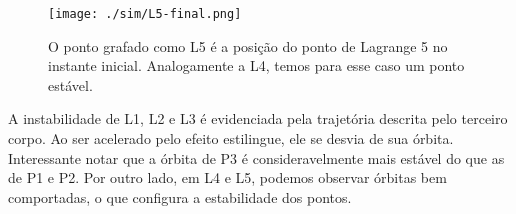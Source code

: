 \begin{figure}[!H]
\centering
\texttt{[image: ./sim/L5-final.png]}
\caption{O ponto grafado como L5 é a posição do ponto de Lagrange 5 no instante inicial. Analogamente a L4, temos para esse caso um ponto estável.}
\end{figure}

   A instabilidade de L1, L2 e L3 é evidenciada pela trajetória descrita pelo terceiro corpo. Ao ser acelerado pelo efeito estilingue, ele se desvia de sua órbita. Interessante notar que a órbita de P3 é consideravelmente mais estável do que as de P1 e P2. Por outro lado, em L4 e L5, podemos observar órbitas bem comportadas, o que configura a estabilidade dos pontos.
